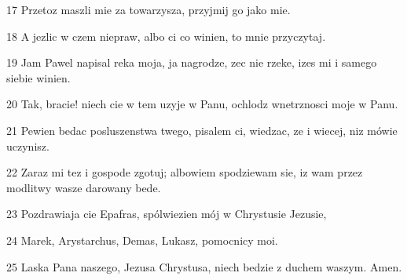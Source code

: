 \par 17 Przetoz maszli mie za towarzysza, przyjmij go jako mie.
\par 18 A jezlic w czem niepraw, albo ci co winien, to mnie przyczytaj.
\par 19 Jam Pawel napisal reka moja, ja nagrodze, zec nie rzeke, izes mi i samego siebie winien.
\par 20 Tak, bracie! niech cie w tem uzyje w Panu, ochlodz wnetrznosci moje w Panu.
\par 21 Pewien bedac posluszenstwa twego, pisalem ci, wiedzac, ze i wiecej, niz mówie uczynisz.
\par 22 Zaraz mi tez i gospode zgotuj; albowiem spodziewam sie, iz wam przez modlitwy wasze darowany bede.
\par 23 Pozdrawiaja cie Epafras, spólwiezien mój w Chrystusie Jezusie,
\par 24 Marek, Arystarchus, Demas, Lukasz, pomocnicy moi.
\par 25 Laska Pana naszego, Jezusa Chrystusa, niech bedzie z duchem waszym. Amen.



